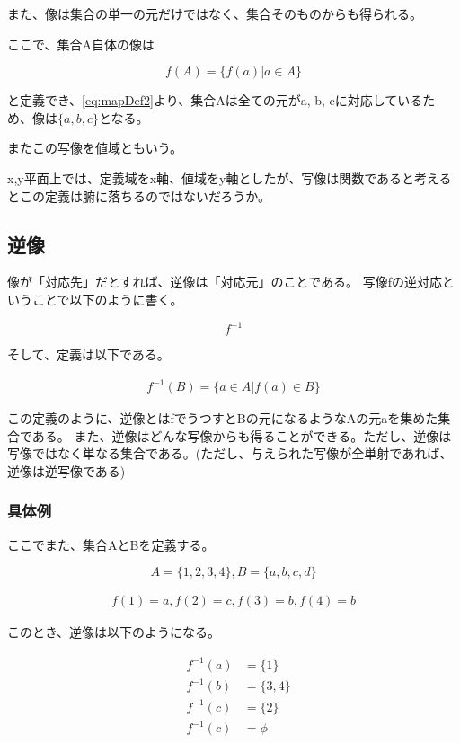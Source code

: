 \documentclass[dvipdfmx,autodetect-engine]{jsarticle}
\begin{document}
また、像は集合の単一の元だけではなく、集合そのものからも得られる。

ここで、集合A自体の像は

$$
f(A) = \{f(a) | a \in A\}
$$

と定義でき、\ref{eq:mapDef2}より、集合Aは全ての元がa, b, cに対応しているため、像は$\{a, b, c\}$となる。

またこの写像を値域ともいう。

x,y平面上では、定義域をx軸、値域をy軸としたが、写像は関数であると考えるとこの定義は腑に落ちるのではないだろうか。

\subsection{逆像}

像が「対応先」だとすれば、逆像は「対応元」のことである。
写像fの逆対応ということで以下のように書く。

$$
f^{-1}
$$

そして、定義は以下である。

\begin{eqnarray}
f^{-1}(B) = \{a \in A | f(a) \in B \}
\label{eq:inverseMapDef}
\end{eqnarray}

この定義のように、逆像とはfでうつすとBの元になるようなAの元aを集めた集合である。
また、逆像はどんな写像からも得ることができる。ただし、逆像は写像ではなく単なる集合である。(ただし、与えられた写像が全単射であれば、逆像は逆写像である)

\subsubsection{具体例}

ここでまた、集合AとBを定義する。

$$
A = \{ 1, 2, 3, 4 \}, B = \{ a, b, c, d\}
$$

\begin{eqnarray}
f(1) = a, f(2) = c, f(3) = b, f(4) = b
\label{eq:mapDef3}
\end{eqnarray}

このとき、逆像は以下のようになる。

\begin{eqnarray*}
&f^{-1}(a) &= \{1\} \\
&f^{-1}(b) &= \{3, 4\} \\
&f^{-1}(c) &= \{2\} \\
&f^{-1}(c) &= \phi \\
\end{eqnarray*}
\end{document}
